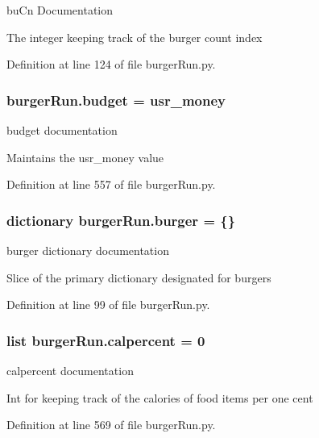 bu\-Cn Documentation 

The integer keeping track of the burger count index 

Definition at line 124 of file burger\-Run.\-py.

\hypertarget{namespaceburgerRun_a25d21c4a1c327675d02da7d876f32059}{
\subsubsection[{budget}]{\setlength{\rightskip}{0pt plus 5cm}burger\-Run.\-budget = {\bf usr\-\_\-money}}}\label{namespaceburgerRun_a25d21c4a1c327675d02da7d876f32059}


budget documentation 

Maintains the usr\-\_\-money value 

Definition at line 557 of file burger\-Run.\-py.

\hypertarget{namespaceburgerRun_a34b47c01482999d2d1bb0c158d203e19}{
\subsubsection[{burger}]{\setlength{\rightskip}{0pt plus 5cm}dictionary burger\-Run.\-burger = \{\}}}\label{namespaceburgerRun_a34b47c01482999d2d1bb0c158d203e19}


burger dictionary documentation 

Slice of the primary dictionary designated for burgers 

Definition at line 99 of file burger\-Run.\-py.

\hypertarget{namespaceburgerRun_ab352607d5142789aa3c953e7b1fa38e6}{
\subsubsection[{calpercent}]{\setlength{\rightskip}{0pt plus 5cm}list burger\-Run.\-calpercent = 0}}\label{namespaceburgerRun_ab352607d5142789aa3c953e7b1fa38e6}


calpercent documentation 

Int for keeping track of the calories of food items per one cent 

Definition at line 569 of file burger\-Run.\-py.

